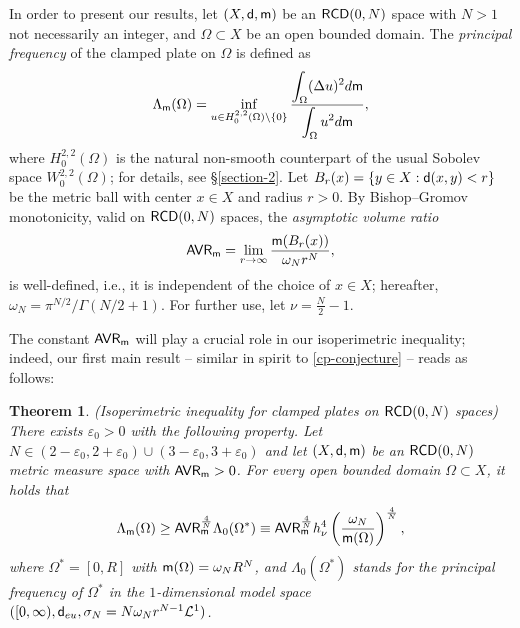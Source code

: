 \documentclass[11pt, reqno]{amsart}
\newtheorem{theorem}{Theorem}[section]
\numberwithin{equation}{section}
\begin{document}
	
In order to present our results, let $(X,{\sf d},{\sf m})$ be an ${\sf RCD}(0,N)$ space with $N>1$ not necessarily an integer, and $\Omega\subset X$ be an open bounded domain. The \textit{principal frequency} of the clamped plate on  $\Omega$ is defined as
	\begin{equation}\label{Rayleigh}
		\Lambda_{\sf m}(\Omega)=\inf_{u\in H^{2,2}_0(\Omega)\setminus \{0\}}\frac{\displaystyle\int_\Omega (\Delta u)^2 {\rm d}{\sf m}}{\displaystyle\int_\Omega u^2 {\rm d}{\sf m}},
	\end{equation}
	where $H_0^{2,2}(\Omega)$ is the natural non-smooth counterpart of the usual Sobolev space $W_0^{2,2}(\Omega)$; for details, see \S\ref{section-2}. 
	Let $B_r(x)=\{y\in X: {\sf d}(x,y)<r\}$ be the metric ball with center $x\in X$ and radius $r>0.$ By  Bishop--Gromov monotonicity, valid on ${\sf RCD}(0,N)$ spaces, the \textit{asymptotic volume ratio}
	\begin{equation} \label{eq:defAVR}
	{\sf AVR}_ {\sf m}=\lim_{r\to \infty}\frac{ {\sf m}(B_r(x))}{\omega_Nr^N},
	\end{equation}
	is well-defined, i.e., it is independent of the choice of $x\in X$; hereafter, $\omega_N=\pi^{N/2}/\Gamma(N/2+1)$.  For further use, let $\nu=\frac{N}{2}-1.$
	
	The constant ${\sf AVR}_ {\sf m}$ will play a crucial role in our isoperimetric inequality; indeed, our first main result -- similar  in spirit to \eqref{cp-conjecture}  --  reads as follows: 
	
	
	
	\begin{theorem}\label{theorem-main} {\rm (Isoperimetric inequality for clamped plates on ${\sf RCD}(0,N)$ spaces)}
		There exists $\varepsilon_0>0$ with the following property. Let $N\in (2-\varepsilon_0,2+\varepsilon_0)\cup (3-\varepsilon_0,3+\varepsilon_0)$ and let  $(X,{\sf d},{\sf m})$ be an  ${\sf RCD}(0,N)$ metric measure space with   ${\sf AVR}_ {\sf m}>0$.  
		For every open bounded domain 
		 $\Omega\subset X$, it holds that
		\begin{equation}\label{inequality}
			\Lambda_{\sf m}(\Omega)\geq {\sf AVR}_ {\sf m}^\frac{4}{N}\Lambda_0(\Omega^*)\equiv {\sf AVR}_ {\sf m}^\frac{4}{N}h_\nu^4\left(\frac{\omega_N}{{\sf m}(\Omega)}\right)^\frac{4}{N},
		\end{equation}
		where $\Omega^*=[0,R]$ with ${\sf m}(\Omega)=\omega_N R^N$,  and $\Lambda_0(\Omega^*)$ stands for  the principal frequency of $\Omega^*$ in the  $1$-dimensional model space $([0,\infty),{\sf d}_{\rm eu},\sigma_N= N\omega_Nr^{N-1}\mathcal L^1)$. 
			\end{theorem}
		
\end{document}
